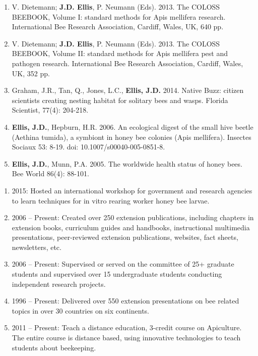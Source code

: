 \begin{enumerate}

\item V. Dietemann; \textbf{J.D. Ellis}, P. Neumann (Eds). 2013. The COLOSS BEEBOOK, Volume I: standard methods for Apis mellifera research. International Bee Research Association, Cardiff, Wales, UK, 640 pp.

\item V. Dietemann; \textbf{J.D. Ellis}, P. Neumann (Eds). 2013. The COLOSS BEEBOOK, Volume II: standard methods for Apis mellifera pest and pathogen research. International Bee Research Association, Cardiff, Wales, UK, 352 pp.

\item Graham, J.R., Tan, Q., Jones, L.C., \textbf{Ellis, J.D.} 2014. Native Buzz: citizen scientists creating nesting habitat for solitary bees and wasps. Florida Scientist, 77(4): 204-218. 

\item \textbf{Ellis, J.D.}, Hepburn, H.R. 2006. An ecological digest of the small hive beetle (Aethina tumida), a symbiont in honey bee colonies (Apis mellifera). Insectes Sociaux 53: 8-19. doi: 10.1007/s00040-005-0851-8. 

\item \textbf{Ellis, J.D.}, Munn, P.A. 2005. The worldwide health status of honey bees. Bee World 86(4): 88-101. 

\end{enumerate}

\begin{enumerate}

\item 2015: Hosted an international workshop for government and research agencies to learn techniques for in vitro rearing worker honey bee larvae.
\item 2006 – Present: Created over 250 extension publications, including chapters in extension books, curriculum guides and handbooks, instructional multimedia presentations, peer-reviewed extension publications, websites, fact sheets, newsletters, etc. 
\item 2006 – Present: Supervised or served on the committee of 25+ graduate students and supervised over 15 undergraduate students conducting independent research projects.
\item 1996 – Present: Delivered over 550 extension presentations on bee related topics in over 30 countries on six continents.
\item 2011 – Present: Teach a distance education, 3-credit course on Apiculture. The entire course is distance based, using innovative technologies to teach students about beekeeping.

\end{enumerate}



